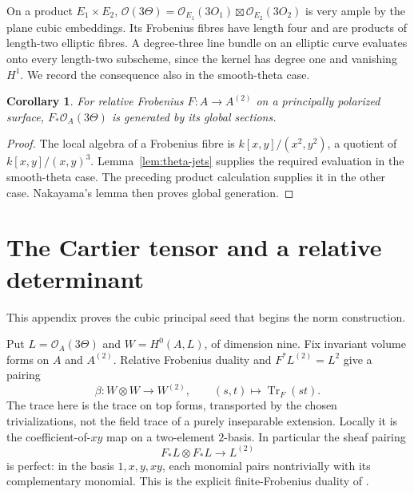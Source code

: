 \documentclass[11pt]{article}
\newtheorem{corollary}[theorem]{Corollary}
\theoremstyle{definition}\newtheorem{definition}[theorem]{Definition}
\theoremstyle{remark}\newtheorem{remark}[theorem]{Remark}
\newcommand{\OO}{\mathcal O}
\newcommand{\Tr}{\operatorname{Tr}}
\begin{document}
On a product $E_1\times E_2$, $\OO(3\Theta)=\OO_{E_1}(3O_1)\boxtimes\OO_{E_2}(3O_2)$ is very ample by the plane cubic embeddings. Its Frobenius fibres have length four and are products of length-two elliptic fibres. A degree-three line bundle on an elliptic curve evaluates onto every length-two subscheme, since the kernel has degree one and vanishing $H^1$. We record the consequence also in the smooth-theta case.

\begin{corollary}\label{cor:fgenerated}
For relative Frobenius $F:A\to A^{(2)}$ on a principally polarized surface, $F_*\OO_A(3\Theta)$ is generated by its global sections.
\end{corollary}
\begin{proof}
The local algebra of a Frobenius fibre is $k[x,y]/(x^2,y^2)$, a quotient of $k[x,y]/(x,y)^3$. Lemma~\ref{lem:theta-jets} supplies the required evaluation in the smooth-theta case. The preceding product calculation supplies it in the other case. Nakayama's lemma then proves global generation.
\end{proof}

\section{The Cartier tensor and a relative determinant}
This appendix proves the cubic principal seed that begins the norm construction.


Put $L=\OO_A(3\Theta)$ and $W=H^0(A,L)$, of dimension nine. Fix invariant volume forms on $A$ and $A^{(2)}$. Relative Frobenius duality and $F^*L^{(2)}=L^2$ give a pairing
\begin{equation}\label{eq:beta}
 \beta:W\otimes W\longrightarrow W^{(2)},\qquad
 (s,t)\longmapsto\Tr_F(st).
\end{equation}
The trace here is the trace on top forms, transported by the chosen trivializations, not the field trace of a purely inseparable extension. Locally it is the coefficient-of-$xy$ map on a two-element $2$-basis. In particular the sheaf pairing
\begin{equation}\label{eq:perfect}
 F_*L\otimes F_*L\longrightarrow L^{(2)}
\end{equation}
is perfect: in the basis $1,x,y,xy$, each monomial pairs nontrivially with its complementary monomial. This is the explicit finite-Frobenius duality of \citet[Lemma~1.3.6, Proposition~1.3.7 and Theorem~1.3.8, pp.~26--28]{BrionKumar}.
\end{document}
